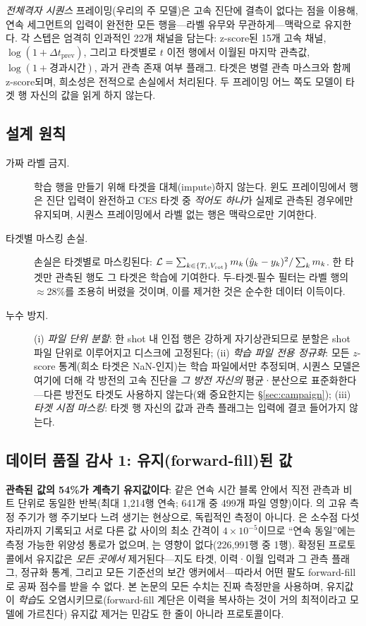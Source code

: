 \documentclass[10pt,a4paper]{article}
\begin{document}
\emph{전체격자 시퀀스} 프레이밍(우리의 주 모델)은 고속 진단에 결측이 없다는
점을 이용해, 연속 세그먼트의 입력이 완전한 모든 행을---라벨 유무와
무관하게---맥락으로 유지한다. 각 스텝은 엄격히 인과적인 22개 채널을 담는다:
z-score된 15개 고속 채널, $\log(1{+}\Delta t_{\mathrm{prev}})$, 그리고 타겟별로
$t$ 이전 행에서 이월된 마지막 관측값, $\log(1{+}\text{경과시간})$, 과거 관측
존재 여부 플래그. 타겟은 병렬 관측 마스크와 함께 z-score되며, 희소성은 전적으로
손실에서 처리된다. 두 프레이밍 어느 쪽도 모델이 타겟 행 자신의 값을 읽게 하지
않는다.

\subsection{설계 원칙}
\begin{description}
  \item[가짜 라벨 금지.] 학습 행을 만들기 위해 타겟을 대체(impute)하지 않는다.
  윈도 프레이밍에서 행은 진단 입력이 완전하고 CES 타겟 중 \emph{적어도 하나}가
  실제로 관측된 경우에만 유지되며, 시퀀스 프레이밍에서 라벨 없는 행은 맥락으로만
  기여한다.
  \item[타겟별 마스킹 손실.] 손실은 타겟별로 마스킹된다:
  $\mathcal{L} = \sum_{k\in\{T_i,V_\mathrm{rot}\}} m_k\,(\hat{y}_k-y_k)^2 / \sum_k m_k$.
  한 타겟만 관측된 행도 그 타겟은 학습에 기여한다. 두-타겟-필수 필터는 라벨 행의
  $\approx$28\%를 조용히 버렸을 것이며, 이를 제거한 것은 순수한 데이터 이득이다.
  \item[누수 방지.] (i) \emph{파일 단위 분할}: 한 shot 내 인접 행은 강하게
  자기상관되므로 분할은 shot 파일 단위로 이루어지고 디스크에 고정된다;
  (ii) \emph{학습 파일 전용 정규화}: 모든 $z$-score 통계(희소 타겟은
  NaN-인지)는 학습 파일에서만 추정되며, 시퀀스 모델은 여기에 더해 각 방전의
  고속 진단을 \emph{그 방전 자신의} 평균·분산으로 표준화한다---다른 방전도
  타겟도 사용하지 않는다(왜 중요한지는 \S\ref{sec:campaign});
  (iii) \emph{타겟 시점 마스킹}: 타겟 행 자신의 값과 관측 플래그는 입력에 결코
  들어가지 않는다.
\end{description}

\subsection{데이터 품질 감사 1: 유지(forward-fill)된 \Vrot{} 값}
\label{sec:stuck}
\textbf{관측된 \Vrot{} 값의 54\%가 계측기 유지값이다}: 같은 연속 시간 블록 안에서
직전 관측과 비트 단위로 동일한 반복(최대 1{,}214행 연속; 641개 중 499개 파일
영향)이다. \Vrot{}의 고유 측정 주기가 행 주기보다 느려 생기는 현상으로,
독립적인 측정이 아니다. \Vrot{}은 소수점 다섯 자리까지 기록되고 서로 다른 값
사이의 최소 간격이 $4\times10^{-5}$이므로 ``연속 동일''에는 측정 가능한 위양성
통로가 없으며, \Ti{}는 영향이 없다(226{,}991행 중 1행). 확정된 프로토콜에서
유지값은 \emph{모든 곳에서} 제거된다---지도 타겟, 이력·이월 입력과 그 관측
플래그, 정규화 통계, 그리고 모든 기준선의 보간 앵커에서---따라서 어떤 팔도
forward-fill로 공짜 점수를 받을 수 없다. 본 논문의 모든 수치는 진짜 측정만을
사용하며, 유지값이 \emph{학습}도 오염시키므로(forward-fill 계단은 이력을 복사하는 것이
거의 최적이라고 모델에 가르친다) 유지값 제거는 민감도 한 줄이 아니라 프로토콜이다.
\end{document}
